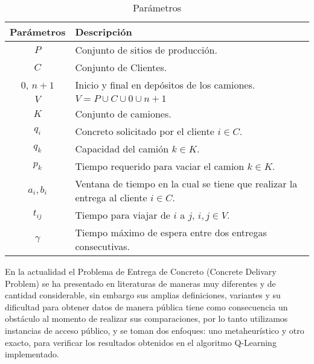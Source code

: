 \documentclass[10pt]{article}
\begin{document}
\begin{table}[h!]
	\begin{center}
	\begin{tabular}{|c|l|}
		\hline
		\textbf{Parámetros} & \textbf{Descripción}                                                                \\ \hline
		$P$                & Conjunto de sitios de producción.                                                   \\ \hline
		$C$                & Conjunto de Clientes.                                                               \\ \hline
		0, $n+1$           & Inicio y final en depósitos de los camiones.                                        \\ \hline
		$V$                & $V = P \cup C \cup {0} \cup {n+1}$                                                  \\ \hline
		$K$                & Conjunto de camiones.                                                               \\ \hline
		$q_i$              & Concreto solicitado por el cliente $i \in C$.                                       \\ \hline
		$q_k$              & Capacidad del camión $k \in K$.                                                     \\ \hline
		$p_k$              & Tiempo requerido para vaciar el camion $k \in K$.                                   \\ \hline
		$a_i,b_i$          & Ventana de tiempo en la cual se tiene que realizar la entrega al cliente $i \in C$. \\ \hline
		$t_{ij}$           & Tiempo para viajar de $i$ a $j$,  $i,j \in V$.                                      \\ \hline
		$\gamma$           & Tiempo máximo de espera entre dos entregas consecutivas.                            \\ \hline
	\end{tabular}
	\caption{Parámetros}
	\label{parametros}
	\end{center}
\end{table}

En la actualidad el Problema de Entrega de Concreto (Concrete Delivary Problem) se ha presentado en literaturas de maneras muy diferentes y de cantidad considerable, sin embargo sus amplias definiciones, variantes y su dificultad para obtener datos de manera pública tiene como consecuencia un obstáculo al momento de realizar sus comparaciones, por lo tanto utilizamos instancias de acceso público, y se toman dos enfoques: uno metaheurístico y otro exacto, para verificar los resultados obtenidos en el algoritmo Q-Learning implementado.
\end{document}
